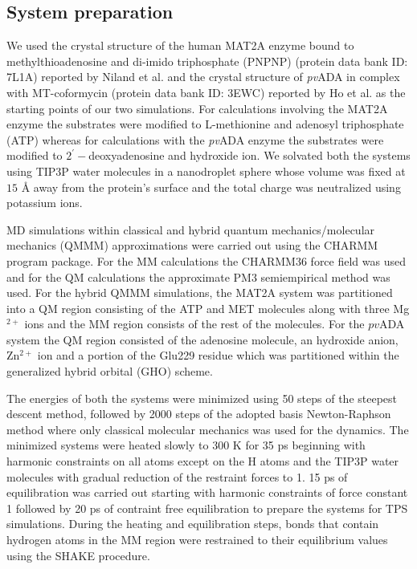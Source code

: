 \documentclass[journal=jpcbfk,manuscript=article,layout=twocolumn]{achemso}
\begin{document}
\subsection{System preparation}
We used the crystal structure of the human MAT2A enzyme 
bound to methylthioadenosine and di-imido triphosphate (PNPNP)
(protein data bank ID: 7L1A) reported by Niland 
et al. \cite{Niland21Biochem60p791,Ghosh21JAmChemSoc143p18325} and the crystal 
structure of \textit{pv}ADA in complex with MT-coformycin (protein data bank ID: 3EWC) 
reported by Ho et al. \cite{Ho09Biochemistry48p9618} as the starting points of our two 
simulations. For calculations involving the MAT2A enzyme the substrates were modified to 
L-methionine and adenosyl triphosphate (ATP) whereas for calculations with the \textit{pv}ADA
enzyme the substrates were modified to $2^{'}-$deoxyadenosine and hydroxide ion. 
We solvated both the systems using TIP3P water molecules \cite{Jorgensen83JChemPhys79p926}
in a nanodroplet sphere whose volume was fixed at $15$ {\AA}
away from the protein's surface and the total charge was neutralized 
using potassium ions. 

MD simulations within classical and hybrid quantum mechanics/molecular mechanics 
(QMMM) approximations were carried out using the CHARMM program 
package. \cite{Brooks83JComputChem4p187} 
For the MM calculations the CHARMM36 force field \cite{Brooks09JComputChem30p1545} 
was used and for the QM calculations the approximate PM3 semiempirical 
method \cite{Repasky02JComputChem23p1601} was used. 
For the hybrid QMMM simulations, the MAT2A system was partitioned into a QM
region consisting of the ATP and MET molecules along with three Mg$^{2+}$ ions 
and the MM region consists of the rest of the molecules. 
For the $pv$ADA system the QM region consisted of 
the adenosine molecule, an hydroxide anion, Zn$^{2+}$ ion and 
a portion of the Glu229 residue which was partitioned within the generalized 
hybrid orbital (GHO) scheme. \cite{Gao98JPhysChemA102p4714}  

The energies of both the systems were minimized using 50 steps of the 
steepest descent method, followed by 2000 steps of the
adopted basis Newton-Raphson method where only classical molecular mechanics 
was used for the dynamics. 
The minimized systems were
heated slowly to 300 K for 35 ps beginning with harmonic
constraints on all atoms except on the H atoms and the TIP3P 
water molecules with gradual reduction of the restraint forces to 1. 
15 ps of equilibration was carried out starting with harmonic 
constraints of force constant 1 followed by 20 ps of contraint free 
equilibration to prepare the systems for TPS simulations. 
During the heating and equilibration steps, bonds that contain 
hydrogen atoms in the MM region were restrained to their equilibrium values 
using the SHAKE procedure. \cite{Ryckaert77JComputPhys23p327} 
\end{document}
